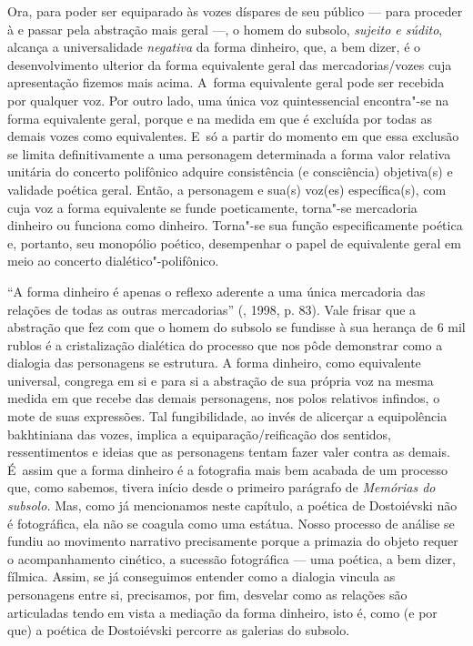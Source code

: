 Ora, para poder ser equiparado às vozes díspares de seu público --- para
proceder à e passar pela abstração mais geral ---, o homem do subsolo,
\emph{sujeito e súdito}, alcança a universalidade \emph{negativa} da
forma dinheiro, que, a bem dizer, é o desenvolvimento ulterior da forma
equivalente geral das mercadorias/vozes cuja apresentação fizemos mais
acima. A~forma equivalente geral pode ser recebida por qualquer voz. Por
outro lado, uma única voz quintessencial encontra"-se na forma
equivalente geral, porque e na medida em que é excluída por todas as
demais vozes como equivalentes. E~só a partir do momento em que essa
exclusão se limita definitivamente a uma personagem determinada a forma
valor relativa unitária do concerto polifônico adquire consistência (e
consciência) objetiva(s) e validade poética geral. Então, a personagem e
sua(s) voz(es) específica(s), com cuja voz a forma equivalente se funde
poeticamente, torna"-se mercadoria dinheiro ou funciona como dinheiro.
Torna"-se sua função especificamente poética e, portanto, seu monopólio
poético, desempenhar o papel de equivalente geral em meio ao concerto
dialético"-polifônico.

``A forma dinheiro é apenas o reflexo aderente a uma única mercadoria
das relações de todas as outras mercadorias'' (, 1998, p. 83). Vale
frisar que a abstração que fez com que o homem do subsolo se fundisse à
sua herança de 6 mil rublos é a cristalização dialética do processo que
nos pôde demonstrar como a dialogia das personagens se estrutura. A
forma dinheiro, como equivalente universal, congrega em si e para si a
abstração de sua própria voz na mesma medida em que recebe das demais
personagens, nos polos relativos infindos, o mote de suas expressões.
Tal fungibilidade, ao invés de alicerçar a equipolência bakhtiniana das
vozes, implica a equiparação/reificação dos sentidos, ressentimentos e
ideias que as personagens tentam fazer valer contra as demais. É~assim
que a forma dinheiro é a fotografia mais bem acabada de um processo que,
como sabemos, tivera início desde o primeiro parágrafo de \emph{Memórias
do subsolo.} Mas, como já mencionamos neste capítulo, a poética de
Dostoiévski não é fotográfica, ela não se coagula como uma estátua.
Nosso processo de análise se fundiu ao movimento narrativo precisamente
porque a primazia do objeto requer o acompanhamento cinético, a sucessão
fotográfica --- uma poética, a bem dizer, fílmica. Assim, se já
conseguimos entender como a dialogia vincula as personagens entre si,
precisamos, por fim, desvelar como as relações são articuladas tendo em
vista a mediação da forma dinheiro, isto é, como (e por que) a poética
de Dostoiévski percorre as galerias do subsolo.


